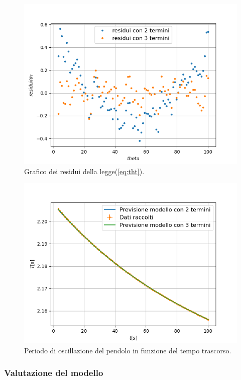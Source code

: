 \documentclass{article}
\begin{document}
\begin{figure}[h!]
	\includegraphics[width=\textwidth]{Residuals_period_law.png}
	\caption{Grafico dei residui della legge(\ref{eq:tht}).}
	\label{fig:ptres}
\end{figure}

\begin{figure}[h!]
	\includegraphics[width=\textwidth]{plot_Periods-time.png}
	\caption{Periodo di oscillazione del pendolo in funzione del tempo trascorso.}
	\label{fig:pt}
\end{figure}

\subsubsection{Valutazione del modello}
\end{document}

